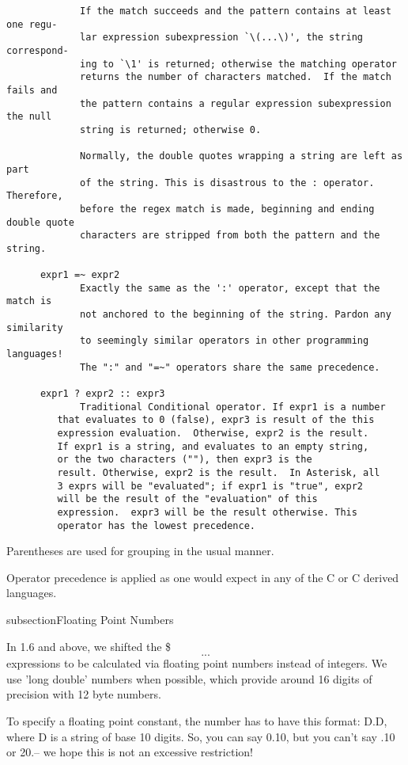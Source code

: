 \begin{verbatim}
             If the match succeeds and the pattern contains at least one regu-
             lar expression subexpression `\(...\)', the string correspond-
             ing to `\1' is returned; otherwise the matching operator
             returns the number of characters matched.  If the match fails and
             the pattern contains a regular expression subexpression the null
             string is returned; otherwise 0.

             Normally, the double quotes wrapping a string are left as part
             of the string. This is disastrous to the : operator. Therefore,
             before the regex match is made, beginning and ending double quote
             characters are stripped from both the pattern and the string.

      expr1 =~ expr2
             Exactly the same as the ':' operator, except that the match is
             not anchored to the beginning of the string. Pardon any similarity
             to seemingly similar operators in other programming languages!
             The ":" and "=~" operators share the same precedence.

      expr1 ? expr2 :: expr3
             Traditional Conditional operator. If expr1 is a number
	     that evaluates to 0 (false), expr3 is result of the this
	     expression evaluation.  Otherwise, expr2 is the result.
	     If expr1 is a string, and evaluates to an empty string,
	     or the two characters (""), then expr3 is the
	     result. Otherwise, expr2 is the result.  In Asterisk, all
	     3 exprs will be "evaluated"; if expr1 is "true", expr2
	     will be the result of the "evaluation" of this
	     expression.  expr3 will be the result otherwise. This
	     operator has the lowest precedence.
\end{verbatim}

Parentheses are used for grouping in the usual manner.

Operator precedence is applied as one would expect in any of the C
or C derived languages.

subsection{Floating Point Numbers}

In 1.6 and above, we shifted the \$\[...\] expressions to be calculated
via floating point numbers instead of integers. We use 'long double' numbers
when possible, which provide around 16 digits of precision with 12 byte numbers. 

To specify a floating point constant, the number has to have this format: D.D, where D is 
a string of base 10 digits. So, you can say 0.10, but you can't say .10 or 20.-- we hope
this is not an excessive restriction!

